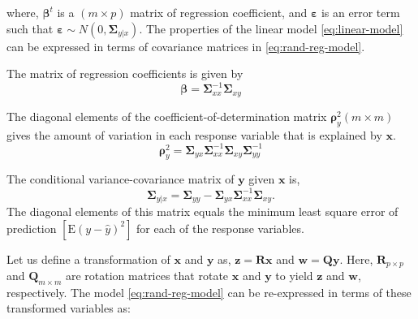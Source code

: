 \documentclass[review]{elsarticle}
\providecommand{\tightlist}{%
  \setlength{\itemsep}{0pt}\setlength{\parskip}{0pt}}
\theoremstyle{definition}
\theoremstyle{definition}
\theoremstyle{remark}
\begin{document}
where, \(\boldsymbol{\beta}^t\) is a \((m \times p)\) matrix of
regression coefficient, and \(\boldsymbol{\varepsilon}\) is an error
term such that
\(\boldsymbol{\varepsilon} \sim N\left(0, \boldsymbol{\Sigma}_{y|x}\right)\).
The properties of the linear model \eqref{eq:linear-model} can be
expressed in terms of covariance matrices in \eqref{eq:rand-reg-model}.

\begin{description}
\tightlist
\item[Regression Coefficients]
The matrix of regression coefficients is given by
\[ \boldsymbol{\beta} = \boldsymbol{\Sigma}_{xx}^{-1}\boldsymbol{\Sigma}_{xy}\]
\item[Coefficient of Determination]
The diagonal elements of the coefficient-of-determination matrix
\(\boldsymbol{\rho}_y^2 (m \times m)\) gives the amount of variation in
each response variable that is explained by \(\mathbf{x}\).
\[\boldsymbol{\rho}_y^2 = \boldsymbol{\Sigma}_{yx}\boldsymbol{\Sigma}_{xx}^{-1}\boldsymbol{\Sigma}_{xy}\boldsymbol{\Sigma}_{yy}^{-1}\]
\item[Conditional variance]
The conditional variance-covariance matrix of \(\mathbf{y}\) given
\(\mathbf{x}\) is,
\[\boldsymbol{\Sigma}_{y|x} = \boldsymbol{\Sigma}_{yy} - \boldsymbol{\Sigma}_{yx}\boldsymbol{\Sigma}_{xx}^{-1}\boldsymbol{\Sigma}_{xy}.\]
The diagonal elements of this matrix equals the minimum least square
error of prediction \(\left[\mathrm{E}(y - \hat{y})^2\right]\) for each
of the response variables.
\end{description}

Let us define a transformation of \(\mathbf{x}\) and \(\mathbf{y}\) as,
\(\mathbf{z} = \mathbf{Rx}\) and \(\mathbf{w} = \mathbf{Qy}\). Here,
\(\mathbf{R}_{p\times p}\) and \(\mathbf{Q}_{m\times m}\) are rotation
matrices that rotate \(\mathbf{x}\) and \(\mathbf{y}\) to yield
\(\mathbf{z}\) and \(\mathbf{w}\), respectively. The model
\eqref{eq:rand-reg-model} can be re-expressed in terms of these
transformed variables as:
\end{document}
